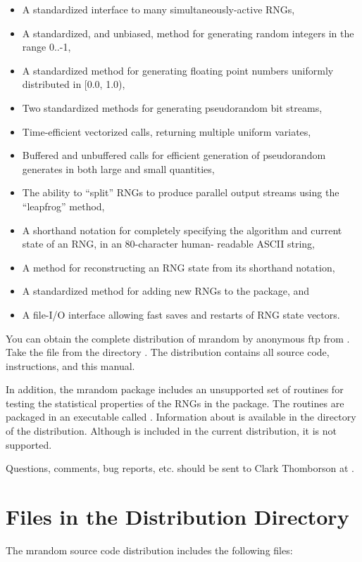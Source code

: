 \begin{itemize}
\item A standardized interface to many simultaneously-active RNGs,
\item A standardized, and unbiased, method for generating random
integers in the range 0..-1,
\item A standardized method for generating floating point numbers
uniformly distributed in [0.0, 1.0),
\item Two standardized methods for generating pseudorandom bit
streams,
\item Time-efficient vectorized calls, returning multiple uniform
variates,
\item Buffered and unbuffered calls for efficient generation of
pseudorandom generates in both large and small quantities,
\item The ability to ``split'' RNGs to produce parallel output streams
using the ``leapfrog'' method,
\item A shorthand notation for completely specifying the
algorithm and current state of an RNG, in an 80-character human-
readable ASCII string,
\item A method for reconstructing an RNG state from its shorthand
notation,
\item A standardized method for adding new RNGs to the package,
and
\item A file-I/O interface allowing fast saves and restarts of RNG state
vectors.
\end{itemize}

You can obtain the complete distribution of mrandom by anonymous ftp
from .  Take the file  from
the directory .  The distribution
contains all source code, instructions, and this manual.

In addition, the mrandom package includes an unsupported set of routines
for testing the statistical properties of the RNGs in the package.  The
routines are packaged in an executable called .
Information about  is available in the 
directory of the distribution.  Although  is included in
the current distribution, it is not supported.

Questions, comments, bug reports, etc. should be sent to Clark
Thomborson at .

\section{Files in the Distribution Directory}
The mrandom source code distribution includes the following
files:

